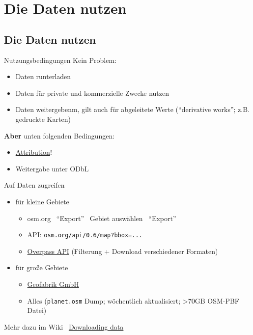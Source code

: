 \documentclass{beamer}
\begin{document}
	\section{Die Daten nutzen}
			
		\begin{frame}
		\tableofcontents[currentsection]
		\end{frame}
		
		\subsection{Die Daten nutzen}
			
			\begin{frame}{Nutzungsbedingungen}
				Kein Problem:
				\begin{itemize}
					\item Daten runterladen
					\item Daten für private und kommerzielle Zwecke nutzen
					\item Daten weitergebenm, gilt auch für abgeleitete Werte (\enquote{derivative works}; z.B. gedruckte Karten)
				\end{itemize}
				\textbf{Aber} unten folgenden Bedingungen:
				\begin{itemize}
					\item \href{https://osmfoundation.org/wiki/Licence/Attribution\_Guidelines}{Attribution}!
					\item Weitergabe unter ODbL
				\end{itemize}
			\end{frame}
			
			\begin{frame}{Auf Daten zugreifen}
				\begin{itemize}
					\item für kleine Gebiete
					\begin{itemize}
						\item osm.org \textrightarrow\ \enquote{Export} \textrightarrow\ Gebiet auswählen \textrightarrow\ \enquote{Export}
						\item API: \href{https://www.openstreetmap.org/api/0.6/map?bbox=9.93116,53.59846,9.93572,53.60052}{\texttt{osm.org/api/0.6/map?bbox=...}}
						\item \href{https://overpass-turbo.eu/}{Overpass API} (Filterung + Download verschiedener Formaten)
					\end{itemize}\pause
					\item für große Gebiete
					\begin{itemize}
						\item \href{https://download.geofabrik.de/}{Geofabrik GmbH}
						\item Alles (\texttt{planet.osm} Dump; wöchentlich aktualisiert; >70GB OSM-PBF Datei)
					\end{itemize}
				\end{itemize}
				\pause
				\vspace{0.25cm}
				Mehr dazu im Wiki \textrightarrow\ \href{https://wiki.openstreetmap.org/wiki/Downloading\_data}{Downloading data}
			\end{frame}
			
\end{document}
